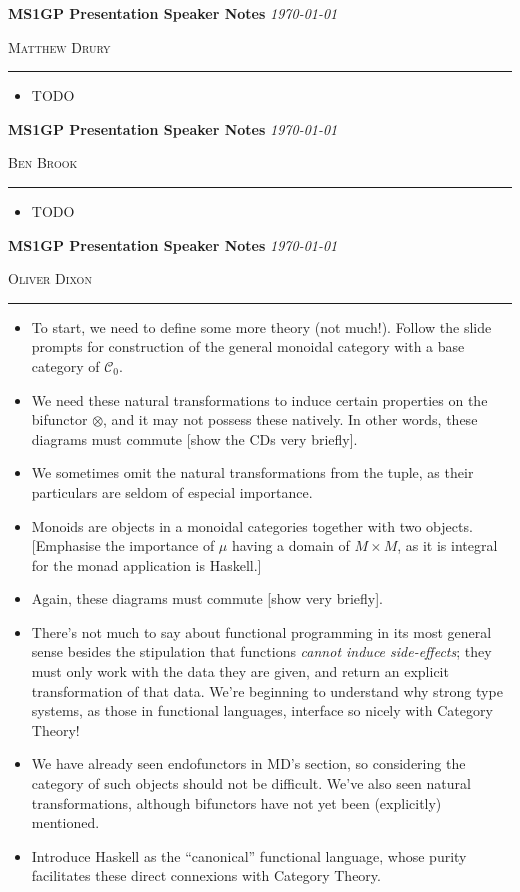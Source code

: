 \documentclass[12pt]{article}
\newcommand{\printheading}[1]{%
        \clearpage
        \large \textbf{MS1GP Presentation Speaker Notes}
        \hfill \textit{\today}

        \vspace{.5em}
        \textsc{#1} \normalsize

        \vspace{1em}
        \hrule
        \vspace{1em}
}
\begin{document}
\printheading{Matthew Drury}
\begin{itemize}
        \item TODO
\end{itemize}

\printheading{Ben Brook}
\begin{itemize}
        \item TODO
\end{itemize}

\printheading{Oliver Dixon}
\begin{itemize}
        \item To start, we need to define some more theory (not much!). Follow
        the slide prompts for construction of the general monoidal category with
        a base category of $\mathcal{C}_0$.
        \item We need these natural transformations to induce certain properties
        on the bifunctor $\otimes$, and it may not possess these natively. In
        other words, these diagrams must commute [show the CDs very briefly].
        \item We sometimes omit the natural transformations from the tuple, as
        their particulars are seldom of especial importance.
        \item Monoids are objects in a monoidal categories together with two
        objects. [Emphasise the importance of $\mu$ having a domain of $M \times
        M$, as it is integral for the monad application is Haskell.]
        \item Again, these diagrams must commute [show very briefly].
        \item There's not much to say about functional programming in its most
        general sense besides the stipulation that functions \emph{cannot induce
        side-effects}; they must only work with the data they are given, and
        return an explicit transformation of that data. We're beginning to
        understand why strong type systems, as those in functional languages,
        interface so nicely with Category Theory!
        \item We have already seen endofunctors in MD's section, so considering
        the category of such objects should not be difficult. We've also seen
        natural transformations, although bifunctors have not yet been
        (explicitly) mentioned.
        \item Introduce Haskell as the ``canonical'' functional language, whose
        purity facilitates these direct connexions with Category Theory.

\end{itemize}
\end{document}
